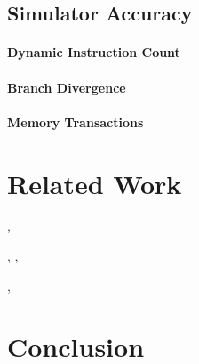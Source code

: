 \documentclass[conference, 10pt]{IEEEtran}
\begin{document}
\subsection{Simulator Accuracy}

\paragraph{Dynamic Instruction Count}

\paragraph{Branch Divergence}

\paragraph{Memory Transactions}

\label{sec:experiments}

\section{Related Work}
\label{sec:related-work}

\cite{ref:ptl-sim}, \cite{ref:simple-scalar}



\cite{ref:ramp}

\cite{ref:ocelot-pact}

\cite{ref:pdes}, \cite{ref:multi-threaded-sim},
\cite{ref:cuda-simulation-of-many-core}

\cite{ref:verilog-cuda}, \cite{ref:bluespec} 

\cite{ref:lynx}


\section{Conclusion}
\label{sec:conclusion}




\end{document}
